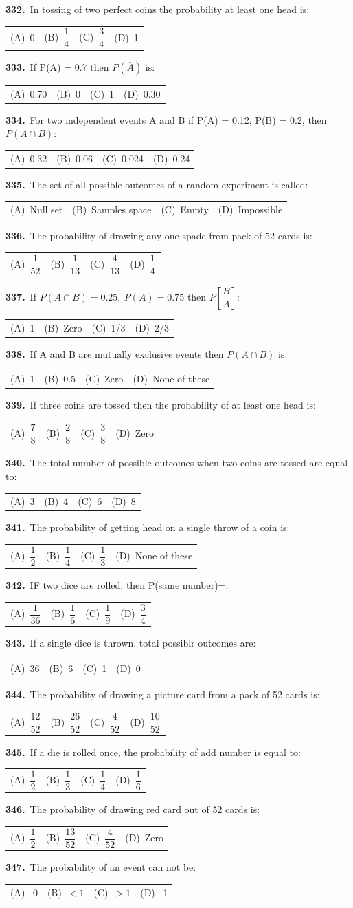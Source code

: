 \documentclass[11pt,a4paper]{article}
\makeatletter
\newcommand{\mcq}[6]{%
  \Needspace{4\baselineskip}%
  \par\medskip\noindent\textbf{#1.}\ #2\par\nopagebreak
  \noindent\begin{tabularx}{\linewidth}{@{\hspace{1.5em}}*{4}{>{\raggedright\arraybackslash}X}@{}}
    (A)~#3 & (B)~#4 & (C)~#5 & (D)~#6
  \end{tabularx}\par}
\makeatother
\begin{document}
\mcq{332}{In tossing of two perfect coins the probability at least one head is:}{0}{$\dfrac{1}{4}$}{$\dfrac{3}{4}$}{1}
\mcq{333}{If P(A) = 0.7 then $P(\overline{A})$ is:}{0.70}{0}{1}{0.30}
\mcq{334}{For two independent events A and B if P(A) = 0.12, P(B) = 0.2, then $P(A\cap B)$:}{0.32}{0.06}{0.024}{0.24}
\mcq{335}{The set of all possible outcomes of a random experiment is called:}{Null set}{Samples space}{Empty}{Impossible}
\mcq{336}{The probability of drawing any one spade from pack of 52 cards is:}{$\dfrac{1}{52}$}{$\dfrac{1}{13}$}{$\dfrac{4}{13}$}{$\dfrac{1}{4}$}
\mcq{337}{If $P(A\cap B)=0.25,\ P(A)=0.75$ then $P\left[\dfrac{B}{A}\right]$:}{1}{Zero}{1/3}{2/3}
\mcq{338}{If A and B are mutually exclusive events then $P(A\cap B)$ is:}{1}{0.5}{Zero}{None of these}
\mcq{339}{If three coins are tossed then the probability of at least one head is:}{$\dfrac{7}{8}$}{$\dfrac{2}{8}$}{$\dfrac{3}{8}$}{Zero}
\mcq{340}{The total number of possible outcomes when two coins are tossed are equal to:}{3}{4}{6}{8}
\mcq{341}{The probability of getting head on a single throw of a coin is:}{$\dfrac{1}{2}$}{$\dfrac{1}{4}$}{$\dfrac{1}{3}$}{None of these}
\mcq{342}{IF two dice are rolled, then P(same number)=:}{$\dfrac{1}{36}$}{$\dfrac{1}{6}$}{$\dfrac{1}{9}$}{$\dfrac{3}{4}$}
\mcq{343}{If a single dice is thrown, total possiblr outcomes are:}{36}{6}{1}{0}
\mcq{344}{The probability of drawing a picture card from a pack of 52 cards is:}{$\dfrac{12}{52}$}{$\dfrac{26}{52}$}{$\dfrac{4}{52}$}{$\dfrac{10}{52}$}
\mcq{345}{If a die is rolled once, the probability of add number is equal to:}{$\dfrac{1}{2}$}{$\dfrac{1}{3}$}{$\dfrac{1}{4}$}{$\dfrac{1}{6}$}
\mcq{346}{The probability of drawing red card out of 52 cards is:}{$\dfrac{1}{2}$}{$\dfrac{13}{52}$}{$\dfrac{4}{52}$}{Zero}
\mcq{347}{The probability of an event can not be:}{-0}{$<1$}{$>1$}{-1}
\end{document}
